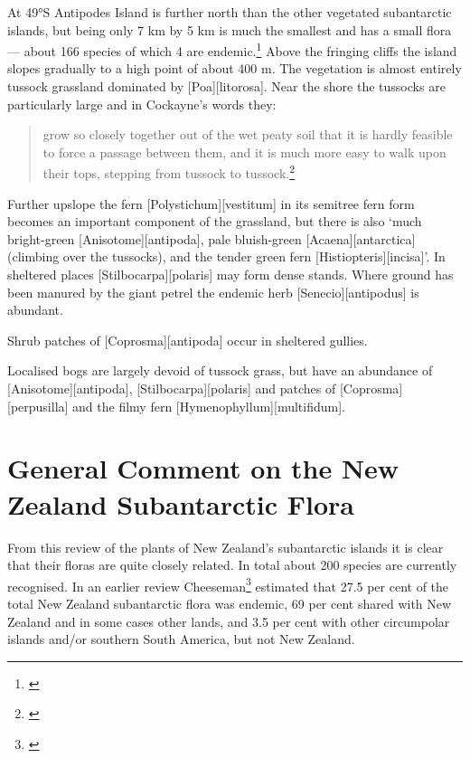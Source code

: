 At 49°S Antipodes Island is further north than the other vegetated subantarctic islands, but being only 7 km by 5 km is much the smallest and has a small flora --- about 166 species of which 4 are endemic.\footnote{\cite{williams1982species}}
Above the fringing cliffs the island slopes gradually to a high point of about 400 m.
The vegetation is almost entirely tussock grassland dominated by [Poa][litorosa].
Near the shore the tussocks are particularly large and in Cockayne's words they:

\begin{quote}
	grow so closely together out of the wet peaty soil that it is hardly feasible to force a passage between them, and it is much more easy to walk upon their tops, stepping from tussock to tussock.\footnote{\cite{cockayne1909ecological}}
\end{quote}

Further upslope the fern [Polystichum][vestitum] in its semitree fern form becomes an important component of the grassland, but there is also `much bright-green [Anisotome][antipoda], pale bluish-green [Acaena][antarctica] (climbing over the tussocks), and the tender green fern [Histiopteris][incisa]'.
In sheltered places [Stilbocarpa][polaris] may form dense stands.
Where ground has been manured by the giant petrel the endemic herb [Senecio][antipodus] is abundant.

Shrub patches of [Coprosma][antipoda] occur in sheltered gullies.

Localised bogs are largely devoid of tussock grass, but have an abundance of [Anisotome][antipoda], [Stilbocarpa][polaris] and patches of [Coprosma][perpusilla] and the filmy fern [Hymenophyllum][multifidum].

\section{General Comment on the New Zealand Subantarctic Flora}

From this review of the plants of New Zealand's subantarctic islands it is clear that their floras are quite closely related.
In total about 200 species are currently recognised.
In an earlier review Cheeseman\footnote{\cite{cheeseman1909systematic}} estimated that 27.5 per cent of the total New Zealand subantarctic flora was endemic, 69 per cent shared with New Zealand and in some cases other lands, and 3.5 per cent with other circumpolar islands and/or southern South America, but not New Zealand.

